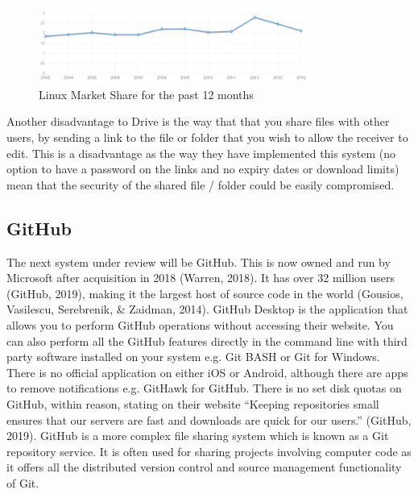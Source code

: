 \documentclass[11pt]{article}
\begin{document}
\begin{figure}[t]
\caption{Linux Market Share for the past 12 months}
\centering
\includegraphics[width=0.8\textwidth]{chart.PNG}
\end{figure}

Another disadvantage to Drive is the way that that you share files with other users, by sending a link to the file or folder that you wish to allow the receiver to edit. This is a disadvantage as the way they have implemented this system (no option to have a password on the links and no expiry dates or download limits) mean that the security of the shared file / folder could be easily compromised.

\subsection{GitHub}

The next system under review will be GitHub. This is now owned and run by Microsoft after acquisition in 2018 (Warren, 2018). It has over 32 million users (GitHub, 2019), making it the largest host of source code in the world  (Gousios, Vasilescu, Serebrenik, \& Zaidman, 2014). GitHub Desktop is the application that allows you to perform GitHub operations without accessing their website. You can also perform all the GitHub features directly in the command line with third party software installed on your system e.g. Git BASH or Git for Windows. There is no official application on either iOS or Android, although there are apps to remove notifications e.g. GitHawk for GitHub. There is no set disk quotas on GitHub, within reason, stating on their website “Keeping repositories small ensures that our servers are fast and downloads are quick for our users.” (GitHub, 2019). GitHub is a more complex file sharing system which is known as a Git repository service. It is often used for sharing projects involving computer code as it offers all the distributed version control and source management functionality of Git.
\end{document}
